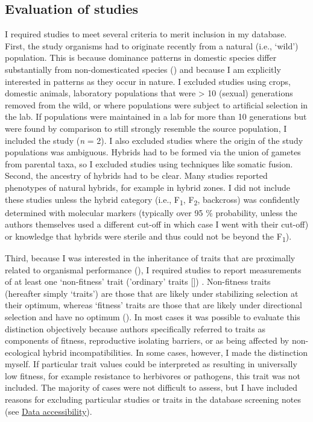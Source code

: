 \documentclass[times, twoside, watermark]{zHenriquesLab-StyleBioRxiv}
\begin{document}
\subsection{Evaluation of studies}
I required studies to meet several criteria to merit inclusion in my database. First, the study organisms had to originate recently from a natural (i.e., ‘wild’) population. This is because dominance patterns in domestic species differ substantially from non-domesticated species (\citealt{Crnokrak1995}) and because I am explicitly interested in patterns as they occur in nature. I excluded studies using crops, domestic animals, laboratory populations that were > 10 (sexual) generations removed from the wild, or where populations were subject to artificial selection in the lab. If populations were maintained in a lab for more than 10 generations but were found by comparison to still strongly resemble the source population, I included the study (\textit{n} = 2). I also excluded studies where the origin of the study populations was ambiguous. Hybrids had to be formed via the union of gametes from parental taxa, so I excluded studies using techniques like somatic fusion. Second, the ancestry of hybrids had to be clear. Many studies reported phenotypes of natural hybrids, for example in hybrid zones. I did not include these studies unless the hybrid category (i.e., F\textsubscript{1}, F\textsubscript{2}, backcross) was confidently determined with molecular markers (typically over 95 \% probability, unless the authors themselves used a different cut-off in which case I went with their cut-off) or knowledge that hybrids were sterile and thus could not be beyond the F\textsubscript{1}). \par

Third, because I was interested in the inheritance of traits that are proximally related to organismal performance (\citealt{McGee2015}), I required studies to report measurements of at least one ‘non-fitness’ trait ('ordinary' traits [\citealt{AllenOrr2001}]) . Non-fitness traits (hereafter simply ‘traits’) are those that are likely under stabilizing selection at their optimum, whereas ‘fitness’ traits are those that are likely under directional selection and have no optimum (\citealt{Merila1999, Schluter1991}). In most cases it was possible to evaluate this distinction objectively because authors specifically referred to traits as components of fitness, reproductive isolating barriers, or as being affected by non-ecological hybrid incompatibilities. In some cases, however, I made the distinction myself. If particular trait values could be interpreted as resulting in universally low fitness, for example resistance to herbivores or pathogens, this trait was not included. The majority of cases were not difficult to assess, but I have included reasons for excluding particular studies or traits in the database screening notes (see \hyperlink{dataacc}{Data accessibility}).\par
\end{document}
